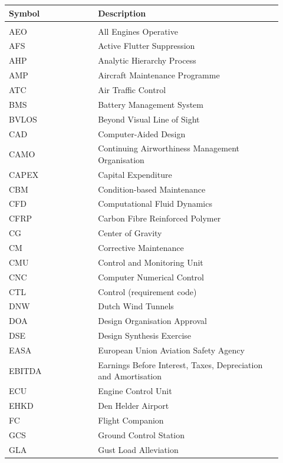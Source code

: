 \begingroup
\setlength{\tabcolsep}{3pt}
\renewcommand{\arraystretch}{1.08}
\scriptsize
\noindent
\begin{minipage}[t]{0.31\textwidth}
\begin{tabular}{@{}%
>{\raggedright\arraybackslash}p{0.30\linewidth}
>{\raggedright\arraybackslash}p{0.62\linewidth}@{}}
\toprule
\textbf{Symbol} & \textbf{Description} \\
\midrule
\multicolumn{2}{@{}l}{\textbf{Abbreviations}} \\
AEO    & All Engines Operative \\
AFS    & Active Flutter Suppression \\
AHP    & Analytic Hierarchy Process \\
AMP    & Aircraft Maintenance Programme \\
ATC    & Air Traffic Control \\
BMS    & Battery Management System \\
BVLOS  & Beyond Visual Line of Sight \\
CAD    & Computer-Aided Design \\
CAMO   & Continuing Airworthiness Management Organisation \\
CAPEX  & Capital Expenditure \\
CBM    & Condition-based Maintenance \\
CFD    & Computational Fluid Dynamics \\
CFRP   & Carbon Fibre Reinforced Polymer \\
CG     & Center of Gravity \\
CM     & Corrective Maintenance \\
CMU    & Control and Monitoring Unit \\
CNC    & Computer Numerical Control \\
CTL    & Control (requirement code) \\
DNW    & Dutch Wind Tunnels \\
DOA    & Design Organisation Approval \\
DSE    & Design Synthesis Exercise \\
EASA   & European Union Aviation Safety Agency \\
EBITDA & Earnings Before Interest, Taxes, Depreciation and Amortisation \\
ECU    & Engine Control Unit \\
EHKD   & Den Helder Airport \\
FC     & Flight Companion \\
GCS    & Ground Control Station \\
GLA    & Gust Load Alleviation \\
\bottomrule
\end{tabular}
\end{minipage}
